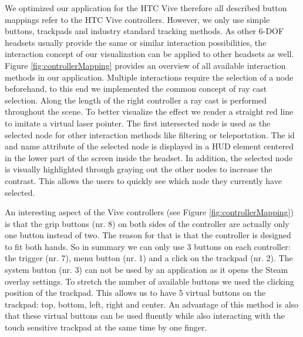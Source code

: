 We optimized our application for the HTC Vive therefore all described button mappings refer to the HTC Vive controllers. However, we only use simple buttons, trackpads and industry standard tracking methods. 
As other 6-DOF headsets usually provide the same or similar interaction possibilities, the interaction concept of our visualization can be applied to other headsets as well.\\
Figure \ref{fig:controllerMapping} provides an overview of all available interaction methods in our application. Multiple interactions require the selection of a node beforehand, to this end we implemented the common concept of ray cast selection. 
Along the length of the right controller a ray cast is performed throughout the scene. To better visualize the effect we render a straight red line to imitate a virtual laser pointer.
The first intersected node is used as the selected node for other interaction methods like filtering or teleportation. The id and name attribute of the selected node is displayed in a HUD element centered in the lower part of the screen inside the headset. In addition, the selected node is visually highlighted through graying out the other nodes to increase the contrast. This allows the users to quickly see which node they currently have selected.

An interesting aspect of the Vive controllers (see Figure \ref{fig:controllerMapping}) is that the grip buttons (nr. 8) on both sides of the controller are actually only one button instead of two. The reason for that is that the controller is designed to fit both hands. 
So in summary we can only use 3 buttons on each controller: the trigger (nr. 7), menu button (nr. 1) and a click on the trackpad (nr. 2). The system button (nr. 3) can not be used by an application as it opens the Steam overlay settings. To stretch the number of available buttons we used the clicking position of the trackpad. This allows us to have 5 virtual buttons on the trackpad: top, bottom, left, right and center. An advantage of this method is also that these virtual buttons can be used fluently while also interacting with the touch sensitive trackpad at the same time by one finger. 

